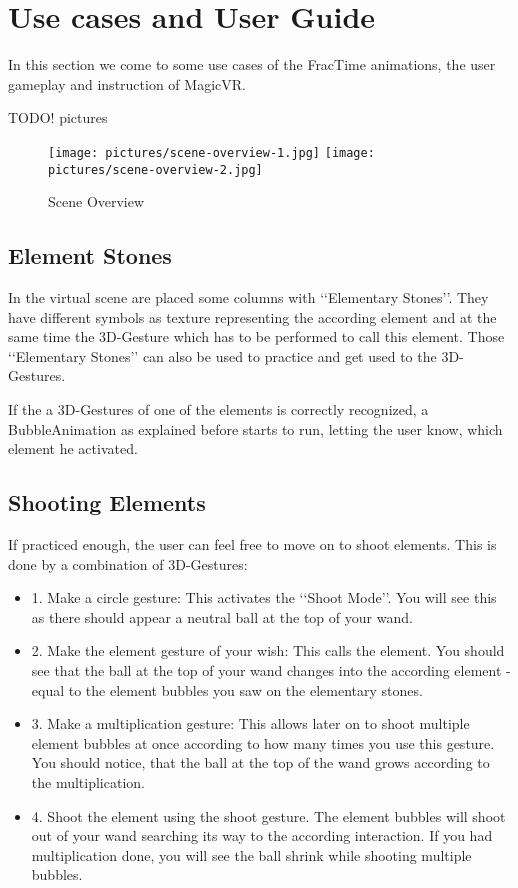 \section{Use cases and User Guide}
In this section we come to some use cases of the FracTime animations, the user gameplay and instruction of MagicVR.

TODO! pictures\\
\begin{figure}[!ht]
\texttt{[image: pictures/scene-overview-1.jpg]}
\texttt{[image: pictures/scene-overview-2.jpg]}
\caption{Scene Overview}
\end{figure}

\subsection{Element Stones}
In the virtual scene are placed some columns with \lq\lq{}Elementary Stones\rq\rq{}. They have different symbols as texture representing the according element and at the same time the 3D-Gesture which has to be performed to call this element. Those \lq\lq{}Elementary Stones\rq\rq{} can also be used to practice and get used to the 3D-Gestures.

If the a 3D-Gestures of one of the elements is correctly recognized, a BubbleAnimation as explained before starts to run, letting the user know, which element he activated.

\subsection{Shooting Elements}
If practiced enough, the user can feel free to move on to shoot elements. This is done by a combination of 3D-Gestures:
\begin{itemize}
\item{1.} Make a circle gesture: This activates the \lq\lq{}Shoot Mode\rq\rq{}. You will see this as there should appear a neutral ball at the top of your wand.
\item{2.} Make the element gesture of your wish: This calls the element. You should see that the ball at the top of your wand changes into the according element - equal to the element bubbles you saw on the elementary stones.
\item{3.} Make a multiplication gesture: This allows later on to shoot multiple element bubbles at once according to how many times you use this gesture. You should notice, that the ball at the top of the wand grows according to the multiplication.
\item{4.} Shoot the element using the shoot gesture. The element bubbles will shoot out of your wand searching its way to the according interaction. If you had multiplication done, you will see the ball shrink while shooting multiple bubbles.
\end{itemize}

